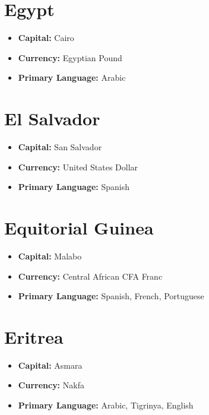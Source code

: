 \documentclass[a4paper,100pt,twoside]{book}
\begin{document}
\section*{\Huge Egypt}
\vspace{5mm} %
\begin{itemize}
	\item \textbf{Capital:} Cairo
	\item \textbf{Currency:} Egyptian Pound
	\item \textbf{Primary Language:} Arabic
\end{itemize}

\section*{\Huge El Salvador}
\vspace{5mm} %
\begin{itemize}
	\item \textbf{Capital:} San Salvador
	\item \textbf{Currency:} United States Dollar
	\item \textbf{Primary Language:} Spanish
\end{itemize}

\section*{\Huge Equitorial Guinea}
\vspace{5mm} %
\begin{itemize}
	\item \textbf{Capital:} Malabo
	\item \textbf{Currency:} Central African CFA Franc
	\item \textbf{Primary Language:} Spanish, French, Portuguese
\end{itemize}

\section*{\Huge Eritrea}
\vspace{5mm} %
\begin{itemize}
	\item \textbf{Capital:} Asmara
	\item \textbf{Currency:} Nakfa
	\item \textbf{Primary Language:} Arabic, Tigrinya, English
\end{itemize}
\end{document}

